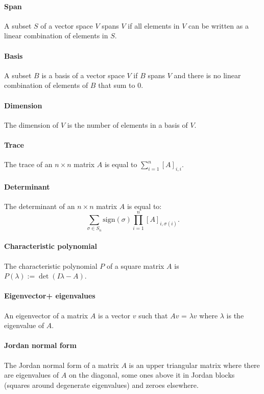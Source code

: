 \documentclass[]{article}
\begin{document}
\paragraph{Span} A subset $S$ of a vector space $V$ spans $V$ if all elements in $V$ can be written as a linear combination of elements in $S$.
\paragraph{Basis} A subset $B$ is a basis of a vector space $V$ if $B$ spans $V$ and there is no linear combination of elements of $B$ that sum to 0. 
\paragraph{Dimension} The dimension of $V$ is the number of elements in a basis of $V$. 
\paragraph{Trace} The trace of an $n \times n$ matrix $A$ is equal to $\sum_{i=1}^n [A]_{i,i}$. 
\paragraph{Determinant} The determinant of an  $n \times n$ matrix $A$ is equal to:
\begin{equation}
	\sum_{\sigma \in S_n} \text{sign}(\sigma) \prod_{i = 1}^n [A]_{i, \sigma(i)}.
\end{equation} 

\paragraph{Characteristic polynomial} The characteristic polynomial $P$ of a square matrix $A$ is $P(\lambda) := \det(I\lambda - A )$. 
\paragraph{Eigenvector+ eigenvalues} An eigenvector of a matrix $A$ is a vector $v$ such that $A v$ = $\lambda v$ where $\lambda$ is the eigenvalue of $A$.
\paragraph{Jordan normal form} The Jordan normal form of a matrix $A$ is an upper triangular matrix where there are eigenvalues of $A$ on the diagonal, some ones above it in Jordan blocks (squares around degenerate eigenvalues) and zeroes elsewhere.
\end{document}
